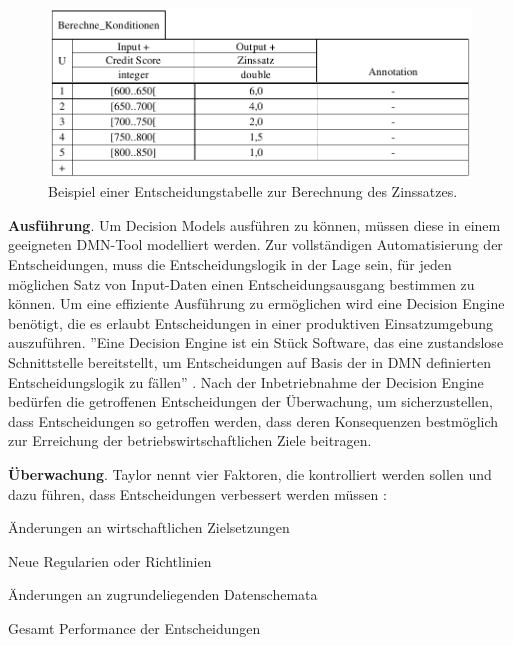\begin{figure}[ht]
\centering
\includegraphics{images/decisiontable.pdf}
\caption{Beispiel einer Entscheidungstabelle zur Berechnung des Zinssatzes.}
\label{fig:decisiontable}
\end{figure} 

\textbf{Ausführung}. Um Decision Models ausführen zu können, müssen diese in einem geeigneten DMN-Tool modelliert werden. Zur vollständigen Automatisierung der Entscheidungen, muss die Entscheidungslogik in der Lage sein, für jeden möglichen Satz von Input-Daten einen
Entscheidungsausgang bestimmen zu können. Um eine effiziente Ausführung zu ermöglichen wird eine Decision Engine benötigt, die es erlaubt Entscheidungen in einer produktiven Einsatzumgebung auszuführen. ''Eine Decision Engine ist ein Stück Software, das eine zustandslose Schnittstelle bereitstellt, um Entscheidungen auf Basis der in DMN definierten Entscheidungslogik zu fällen'' \cite[S. 41]{BR16}. Nach der Inbetriebnahme der Decision Engine bedürfen die getroffenen Entscheidungen der Überwachung, um sicherzustellen, dass Entscheidungen so getroffen werden, dass deren Konsequenzen bestmöglich zur Erreichung der betriebswirtschaftlichen Ziele beitragen. 

\textbf{Überwachung}. Taylor nennt vier Faktoren, die kontrolliert werden sollen und dazu führen, dass Entscheidungen verbessert werden müssen \cite[vgl. S. 158]{JT11}:

\begin{enumerate*}
\item Änderungen an wirtschaftlichen Zielsetzungen
\item Neue Regularien oder Richtlinien
\item Änderungen an zugrundeliegenden Datenschemata  
\item Gesamt Performance der Entscheidungen\end{enumerate*}   

